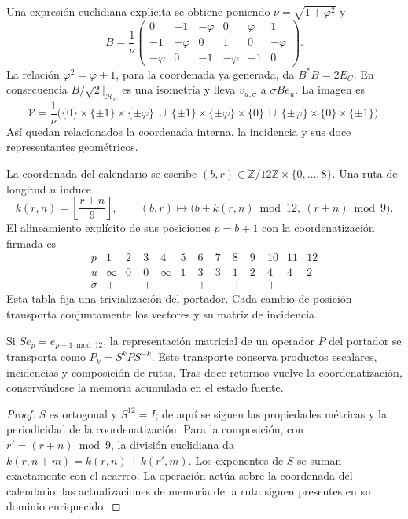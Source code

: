 Una expresión euclidiana explícita se obtiene poniendo
\(\nu=\sqrt{1+\varphi^2}\) y
\[
 B=\frac1\nu
 \begin{pmatrix}
 0&-1&-\varphi&0&\varphi&1\\
 -1&-\varphi&0&1&0&-\varphi\\
 -\varphi&0&-1&-\varphi&-1&0
 \end{pmatrix}.
\]
La relación \(\varphi^2=\varphi+1\), para la coordenada ya generada,
da \(B^*B=2E_C\).
En consecuencia \(B/\sqrt2|_{\mathcal H_C}\) es una isometría y lleva
\(v_{u,\sigma}\) a \(\sigma Be_u\). La imagen es
\[
 \mathcal V=\frac1\nu\bigl(
 \{0\}\times\{\pm1\}\times\{\pm\varphi\}\ \cup\
 \{\pm1\}\times\{\pm\varphi\}\times\{0\}\ \cup\
 \{\pm\varphi\}\times\{0\}\times\{\pm1\}\bigr).
\]
Así quedan relacionados la coordenada interna, la incidencia y sus
doce representantes geométricos.

La coordenada del calendario se escribe \((b,r)\in
\mathbb Z/12\mathbb Z\times\{0,\ldots,8\}\). Una ruta de longitud \(n\)
induce
\[
 k(r,n)=\left\lfloor\frac{r+n}{9}\right\rfloor,\qquad
 (b,r)\longmapsto
 \bigl(b+k(r,n)\bmod12,\ (r+n)\bmod9\bigr).
\]
El alineamiento explícito de sus posiciones \(p=b+1\) con la coordenatización firmada es
\[
\begin{array}{c|rrrrrrrrrrrr}
p&1&2&3&4&5&6&7&8&9&10&11&12\\ \hline
u&\infty&0&0&\infty&1&3&3&1&2&4&4&2\\
\sigma&+&-&+&-&-&+&-&+&-&+&-&+
\end{array}
\]
Esta tabla fija una trivialización del portador. Cada cambio de posición
transporta conjuntamente los vectores y su matriz de incidencia.

\begin{proposition}
Si \(S e_p=e_{p+1\bmod12}\), la representación matricial de un
operador \(P\) del portador se transporta como \(P_k=S^kPS^{-k}\).
Este transporte conserva productos escalares, incidencias y composición
de rutas. Tras doce retornos vuelve la coordenatización, conservándose la memoria
acumulada en el estado fuente.
\end{proposition}
\begin{proof}
\(S\) es ortogonal y \(S^{12}=I\); de aquí se siguen las propiedades
métricas y la periodicidad de la coordenatización. Para la composición, con
\(r'=(r+n)\bmod9\), la división euclidiana da
\(k(r,n+m)=k(r,n)+k(r',m)\). Los exponentes de \(S\) se suman
exactamente con el acarreo. La operación actúa sobre la coordenada
del calendario; las actualizaciones de memoria de la ruta siguen
presentes en su dominio enriquecido.
\end{proof}

